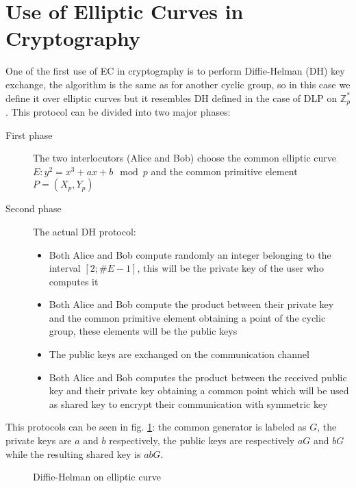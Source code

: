 \documentclass{article}
\begin{document}

\section{Use of Elliptic Curves in Cryptography}
\label{sec:use}

One of the first use of EC in cryptography is to perform Diffie-Helman (DH) key exchange, the algorithm is the same as for another cyclic group, so in this case we define it over elliptic curves but it resembles DH defined in the case of DLP on $\mathbb{Z}_p^*$.\newline
This protocol can be divided into two major phases:
\begin{description}
	\item[First phase  ] The two interlocutors (Alice and Bob) choose the common elliptic curve $E: y^2 = x^3 + ax+ b \mod p$ and the common primitive element $P = (X_p, Y_p)$
	\item[Second phase] The actual DH protocol: 
	\begin{itemize}
		\item Both Alice and Bob compute randomly an integer belonging to the interval $[2; \#E-1]$, this will be the private key of the user who computes it
		\item Both Alice and Bob compute the product between their private key and the common primitive element obtaining a point of the cyclic group, these elements will be the public keys
		\item The public keys are exchanged on the communication channel
		\item Both Alice and Bob computes the product between the received public key and their private key obtaining a common point which will be used as shared key to encrypt their communication with symmetric key 
	\end{itemize}
\end{description} 

This protocols can be seen in fig. \ref{fig:ECDH}: the common generator is labeled as $G$, the private keys are $a$ and $b$ respectively, the public keys are respectively $aG$ and $bG$ while the resulting shared key is $abG$.

\begin{figure}[H]
	\centering
	\caption{Diffie-Helman on elliptic curve \cite{ECDH}}
	\label{fig:ECDH}
\end{figure}
\end{document}

